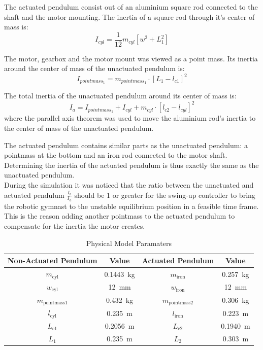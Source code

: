 The actuated pendulum consist out of an aluminium square rod connected to the shaft and the motor mounting. The inertia of a square rod through it's center of mass is: $$ I_{cyl} = \frac{1}{12}m_{cyl}[w^2+L^2_{1}]$$

The motor, gearbox and the motor mount was viewed as a point mass. Its inertia around the center of mass of the unactuated pendulum is: $$I_{pointmass_1} = m_{pointmass_1}\cdot[L_{1}-l_{c1}]^2 $$

The total inertia of the unactuated pendulum around its center of mass is: $$ I_{a} =I_{pointmass_1} +  I_{cyl} + m_{cyl}\cdot[l_{c2}-l_{cyl}]^2 $$ where the parallel axis theorem was used to move the aluminium rod's inertia to the center of mass of the unactuated pendulum.

The actuated pendulum contains similar parts as the unactuated pendulum: a pointmass at the bottom and an iron rod connected to the motor shaft. Determining the inertia of the actuated pendulum is thus exactly the same as the unactuated pendulum.\\

During the simulation it was noticed that the ratio between the unactuated and actuated pendulum $\frac{I_{b}}{I_{a}}$ should be 1 or greater for the swing-up controller to bring the robotic gymnast to the unstable equilibrium position in a feasible time frame. This is the reason adding another pointmass to the actuated pendulum to compensate for the inertia the motor creates.


\begin{table}[]
	\centering
	\begin{tabular}{|c|c|c|c|}
		\hline
		Non-Actuated Pendulum& Value & Actuated Pendulum & Value \\
		\hline
		\hline
		$m_{\text{cyl}}$ & \SI{0.1443}{\kilogram} & $m_{\text{iron}}$ & \SI{0.257}{\kilogram} \\
		\hline
		$w_{\text{cyl}}$ & \SI{12}{mm}& $w_{\text{iron}}$& \SI{12}{mm} \\
		\hline
		$m_{\text{pointmass1}}$ & \SI{0.432}{\kilogram}& $m_{\text{pointmass2}}$& \SI{0.306}{\kilogram}\\
		\hline
		$l_{\text{cyl}}$ & \SI{0.235}{\meter}& $l_{\text{iron}}$& \SI{0.223}{\meter} \\
		\hline
		$L_{\text{c1}}$ & \SI{0.2056}{\meter} & $L_{\text{c2}}$& \SI{0.1940}{\meter}\\
		\hline
		$L_{1}$ & \SI{0.235}{\meter}& $L_{2}$& \SI{0.303}{\meter} \\
		\hline
	\end{tabular}
	\caption{Physical Model Paramaters}
	\label{table:model_param}
\end{table}

